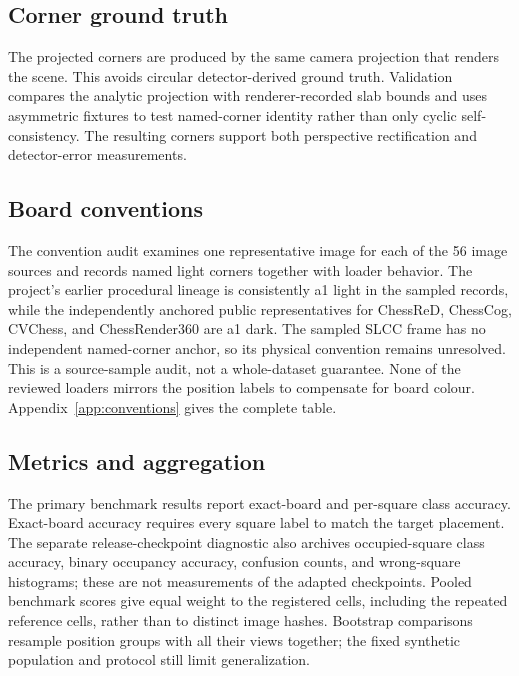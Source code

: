 \subsection{Corner ground truth}

The projected corners are produced by the same camera projection that renders
the scene. This avoids circular detector-derived ground truth. Validation
compares the analytic projection with renderer-recorded slab bounds and uses
asymmetric fixtures to test named-corner identity rather than only cyclic
self-consistency. The resulting corners support both perspective rectification
and detector-error measurements.

\subsection{Board conventions}

The convention audit examines one representative image for each of the 56 image
sources and records named light corners together with loader behavior. The
project's earlier procedural lineage is consistently a1 light in the sampled
records, while the independently anchored public representatives for ChessReD,
ChessCog, CVChess, and ChessRender360 are a1 dark. The sampled SLCC frame has no
independent named-corner anchor, so its physical convention remains unresolved.
This is a source-sample audit, not a whole-dataset guarantee. None of the
reviewed loaders mirrors the position labels to compensate for board colour.
Appendix~\ref{app:conventions} gives the complete table.

\subsection{Metrics and aggregation}

The primary benchmark results report exact-board and per-square class accuracy.
Exact-board accuracy requires every square label to match the target placement.
The separate release-checkpoint diagnostic also archives occupied-square class
accuracy, binary occupancy accuracy, confusion counts, and wrong-square
histograms; these are not measurements of the adapted checkpoints. Pooled
benchmark scores give equal weight to the registered cells, including the repeated
reference cells, rather than to distinct image hashes. Bootstrap comparisons
resample position groups with all their views together; the fixed synthetic
population and protocol still limit generalization.

